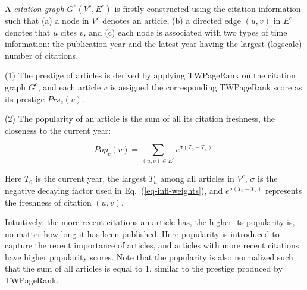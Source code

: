 A {\em citation graph} $G^c(V^c, E^c)$ is firstly constructed using the citation information such that (a) a node in $V^c$ denotes an article, (b) a directed edge $(u,v)$ in $E^c$ denotes that $u$ cites $v$, and (c) each node is associated with two types of time information: the publication year and the latest year having the largest (logscale) number of citations.


\sstab(1) The prestige of articles is derived by applying TWPageRank on the citation graph $G^c$, and each article $v$ is assigned the corresponding TWPageRank score as its prestige $Prs_c(v)$.

\sstab(2)  The popularity of an article is the sum of all its citation freshness, \ie the closeness to the current year:

\vspace{-1ex}
\begin{small}
\begin{equation}\label{eq-pop}
Pop_c(v) = \sum_{{(u,v)\in E^c}} {e^{\sigma (T_0-T_u)}}.
\end{equation}
\end{small}
\noindent
Here $T_0$ is the current year, \ie the largest $T_u$ among all articles in $V^c$, $\sigma$ is the negative decaying factor used in Eq.~(\ref{eq-infl-weights}), and $e^{\sigma (T_0-T_u)}$ represents the freshness of citation $(u,v)$.


Intuitively, the more recent citations an article has, the higher its popularity is, no matter how long it has been published.
Here popularity is introduced to capture the recent importance of articles, and articles with more recent citations have higher popularity scores. %
%
%
Note that the popularity is also normalized such that the sum of  all articles is equal to $1$, similar to the prestige produced by TWPageRank.

